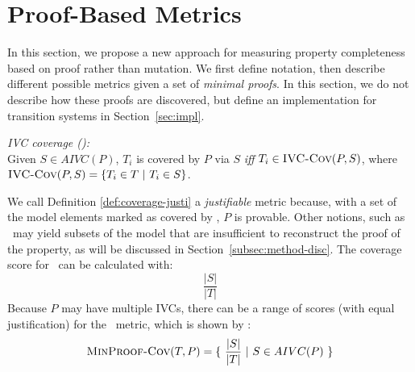 \newcommand{\minproofcov}{\text{\sc MinProof-Cov}}


\section{Proof-Based Metrics}
\label{sec:method}

In this section, we propose a new approach for measuring property completeness based on proof rather than mutation.  We first define notation, then describe different possible metrics given a set of {\em minimal proofs}.  In this section, we do not describe how these proofs are discovered, but define an implementation for transition systems in Section~\ref{sec:impl}.

\begin{definition} {\emph{IVC coverage (\ivccov):}} \\
\label{def:coverage-justi}
Given $S \in AIVC(P)$, $T_i$ is covered by $P$ via $S$ \emph{iff} $T_i \in \text{\sc IVC-Cov} (P, S)$, where
$\text{\sc IVC-Cov} (P, S) = \{ T_i \in T ~|~ T_i \in S \}$.
\end{definition}
\vspace{2mm}

%
We call Definition \ref{def:coverage-justi} a \emph{justifiable} metric because, with a set of the model elements marked as covered by \ivccov, $P$ is provable.  Other notions, such as \nondetcov\ may yield subsets of the model that are insufficient to reconstruct the proof of the property, as will be discussed in Section~\ref{subsec:method-disc}. %
The coverage score for \ivccov\ can be calculated with: $$\frac{|S|}{|T|}$$
Because $P$ may have multiple IVCs, there can be a range of scores (with equal justification) for the \ivccov\ metric, which is shown by \minproofcov:
\[
   \minproofcov(T, P) = \{~\frac{ |S|}{|T|}~|~S \in AIVC(P)~\}
\]

